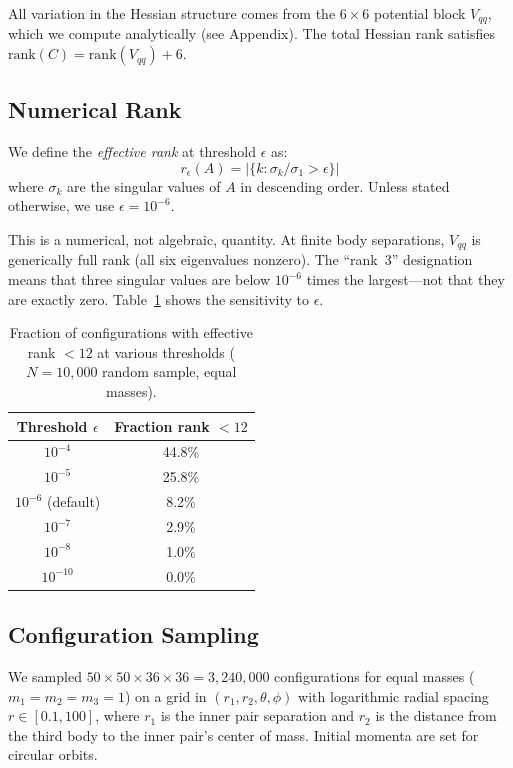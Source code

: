\documentclass[aps,pre,twocolumn,superscriptaddress,floatfix]{revtex4-2}
\begin{document}
All variation in the Hessian structure comes from the $6 \times 6$
potential block $V_{qq}$, which we compute analytically (see
Appendix). The total Hessian rank satisfies
$\mathrm{rank}(C) = \mathrm{rank}(V_{qq}) + 6$.

\subsection{Numerical Rank}

We define the \emph{effective rank} at threshold $\epsilon$ as:
\begin{equation}
r_\epsilon(A) = |\{k : \sigma_k / \sigma_1 > \epsilon\}|
\end{equation}
where $\sigma_k$ are the singular values of $A$ in descending order.
Unless stated otherwise, we use $\epsilon = 10^{-6}$.

This is a numerical, not algebraic, quantity. At finite body
separations, $V_{qq}$ is generically full rank (all six eigenvalues
nonzero). The ``rank~3'' designation means that three singular values
are below $10^{-6}$ times the largest---not that they are exactly zero.
Table~\ref{tab:threshold} shows the sensitivity to $\epsilon$.

\begin{table}[h]
\caption{Fraction of configurations with effective rank $< 12$
at various thresholds ($N = 10{,}000$ random sample, equal masses).}
\label{tab:threshold}
\begin{ruledtabular}
\begin{tabular}{cc}
Threshold $\epsilon$ & Fraction rank $< 12$ \\
\hline
$10^{-4}$ & 44.8\% \\
$10^{-5}$ & 25.8\% \\
$10^{-6}$ (default) & 8.2\% \\
$10^{-7}$ & 2.9\% \\
$10^{-8}$ & 1.0\% \\
$10^{-10}$ & 0.0\% \\
\end{tabular}
\end{ruledtabular}
\end{table}

\subsection{Configuration Sampling}

We sampled $50 \times 50 \times 36 \times 36 = 3{,}240{,}000$
configurations for equal masses ($m_1 = m_2 = m_3 = 1$) on a grid
in $(r_1, r_2, \theta, \phi)$ with logarithmic radial spacing
$r \in [0.1, 100]$, where $r_1$ is the inner pair separation and
$r_2$ is the distance from the third body to the inner pair's
center of mass. Initial momenta are set for circular orbits.
\end{document}
